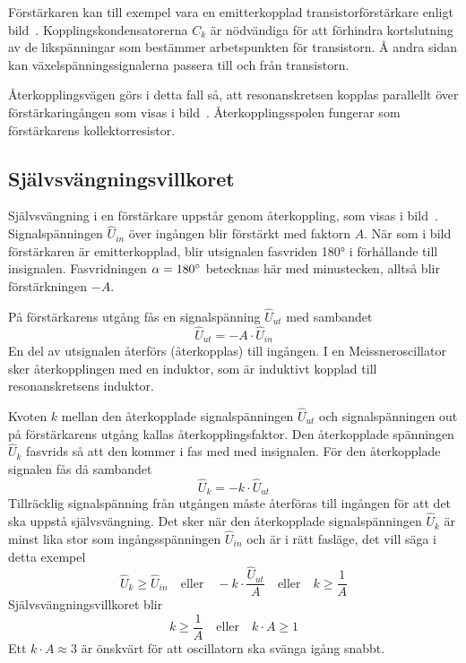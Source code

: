 Förstärkaren kan till exempel vara en emitterkopplad transistorförstärkare
enligt bild~.
Kopplingskondensatorerna \(C_k\) är nödvändiga för att förhindra kortslutning
av de likspänningar som bestämmer arbetspunkten för transistorn.
Å andra sidan kan växelspänningssignalerna passera till och från transistorn.

Återkopplingsvägen görs i detta fall så, att resonanskretsen kopplas
parallellt över förstärkaringången som visas i bild~.
Återkopplingsspolen fungerar som förstärkarens kollektorresistor.

\subsection{Självsvängningsvillkoret}


Självsvängning i en förstärkare uppstår genom återkoppling, som visas i
bild~.
Signalspänningen \(\hat{U}_{in}\) över ingången blir förstärkt med
faktorn \(A\).
När som i bild~ förstärkaren är emitterkopplad, blir
utsignalen fasvriden \ang{180} i förhållande till insignalen.
Fasvridningen \(\alpha=180\degree\) betecknas här med minustecken, alltså blir
förstärkningen \(-A\).

På förstärkarens utgång fås en signalspänning \(\hat{U}_{ut}\) med sambandet
%
\[\hat{U}_{ut} = -A \cdot \hat{U}_{in}\]
%
En del av utsignalen återförs (återkopplas) till ingången.
I en Meissneroscillator sker återkopplingen med en induktor, som är
induktivt kopplad till resonanskretsens induktor.

Kvoten \(k\) mellan den återkopplade signalspänningen \(\hat{U}_{ut}\) och
signalspänningen out på förstärkarens utgång kallas återkopplingsfaktor.
Den återkopplade spänningen \(\hat{U}_k\) fasvrids så att den kommer
i fas med med insignalen.
För den återkopplade signalen fås då sambandet
%
\[\hat{U}_k = -k \cdot \hat{U}_{ut}\]
%
Tillräcklig signalspänning från utgången måste återföras till ingången
för att det ska uppstå självsvängning.
Det sker när den återkopplade signalspänningen \(\hat{U}_k\) är minst lika stor
som ingångsspänningen \(\hat{U}_{in}\) och är i rätt fasläge, det vill säga i
detta exempel
%
\[
\hat{U}_k \geq \hat{U}_{in}
\quad \text{eller} \quad
-k \cdot \frac{\hat{U}_{ut}}{A}
\quad \text{eller} \quad
k \geq \frac{1}{A}
\]
%
Självsvängningsvillkoret blir
%
\[
k \geq \frac{1}{A}
\quad \text{eller} \quad
k \cdot A \geq 1
\]
%
Ett \(k \cdot A \approx 3\) är önskvärt för att oscillatorn ska svänga igång
snabbt.


